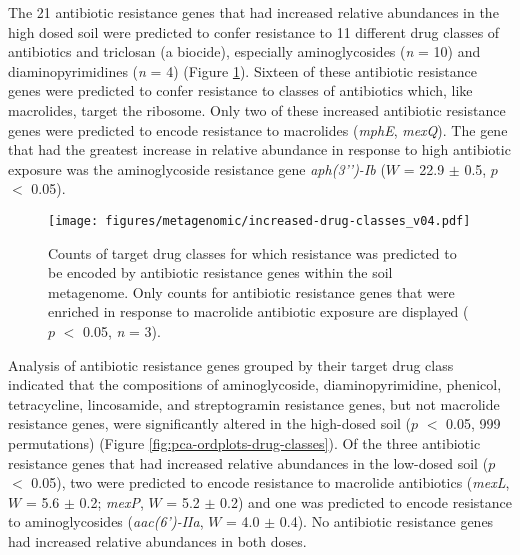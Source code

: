 The 21 antibiotic resistance genes that had increased relative abundances in the high dosed soil were predicted to confer resistance to 11 different drug classes of antibiotics and triclosan (a biocide), especially aminoglycosides (\textit{n} = 10) and diaminopyrimidines (\textit{n} = 4) (Figure \ref{fig:increased-drug-classes}).
Sixteen of these antibiotic resistance genes were predicted to confer resistance to classes of antibiotics which, like macrolides, target the ribosome.
Only two of these increased antibiotic resistance genes were predicted to encode resistance to macrolides (\textit{mphE}, \textit{mexQ}).
The gene that had the greatest increase in relative abundance in response to high antibiotic exposure was the aminoglycoside resistance gene \textit{aph(3’’)-Ib} ($W$ = 22.9 $\pm$ 0.5, $p$ $<$ 0.05).

\begin{figure}[htpb]
	\centering
		\texttt{[image: figures/metagenomic/increased-drug-classes\_v04.pdf]}
	\caption[Counts of target drug classes for which resistance was predicted to be encoded by antibiotic resistance genes within the soil metagenome.]{
		Counts of target drug classes for which resistance was predicted to be encoded by antibiotic resistance genes within the soil metagenome.
		Only counts for antibiotic resistance genes that were enriched in response to macrolide antibiotic exposure are displayed ($p$ $<$ 0.05, \textit{n} = 3).
	}
	\label{fig:increased-drug-classes}
\end{figure}

Analysis of antibiotic resistance genes grouped by their target drug class indicated that the compositions of aminoglycoside, diaminopyrimidine, phenicol, tetracycline, lincosamide, and streptogramin resistance genes, but not macrolide resistance genes, were significantly altered in the high-dosed soil ($p$ $<$ 0.05, 999 permutations) (Figure \ref{fig:pca-ordplots-drug-classes}).
Of the three antibiotic resistance genes that had increased relative abundances in the low-dosed soil ($p$ $<$ 0.05), two were predicted to encode resistance to macrolide antibiotics (\textit{mexL}, $W$ = 5.6 $\pm$ 0.2; \textit{mexP}, $W$ = 5.2 $\pm$ 0.2) and one was predicted to encode resistance to aminoglycosides (\textit{aac(6’)-IIa}, $W$ = 4.0 $\pm$ 0.4). No antibiotic resistance genes had increased relative abundances in both doses.


